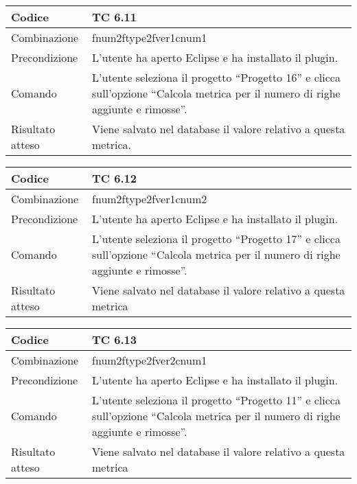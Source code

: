\begin{table}[ht]
\begin{tabular}{|p{3cm}|p{9cm}|}
\hline
\cellcolor{lightgray}Codice				& TC 6.11								\\
\hline
\cellcolor{lightgray}Combinazione		& fnum2ftype2fver1cnum1									\\
\hline
\cellcolor{lightgray}Precondizione		& L'utente ha aperto Eclipse e ha installato il plugin.		\\
\hline
\cellcolor{lightgray}Comando			& L'utente seleziona il progetto ``Progetto 16''  e clicca sull'opzione ``Calcola metrica per il numero di righe aggiunte e rimosse''.	\\
\hline
\cellcolor{lightgray}Risultato atteso	& Viene salvato nel database il valore relativo a questa metrica.\\
\hline
\end{tabular}
\end{table}

\begin{table}[ht]
\begin{tabular}{|p{3cm}|p{9cm}|}
\hline
\cellcolor{lightgray}Codice				& TC 6.12								\\
\hline
\cellcolor{lightgray}Combinazione		& fnum2ftype2fver1cnum2 									\\
\hline
\cellcolor{lightgray}Precondizione		& L'utente ha aperto Eclipse e ha installato il plugin.				\\
\hline
\cellcolor{lightgray}Comando			& L'utente seleziona il progetto ``Progetto 17''  e clicca sull'opzione ``Calcola metrica per il numero di righe aggiunte e rimosse''.	\\
\hline
\cellcolor{lightgray}Risultato atteso	& Viene salvato nel database il valore relativo a questa metrica	\\
\hline
\end{tabular}
\end{table}

\begin{table}[ht]
\begin{tabular}{|p{3cm}|p{9cm}|}
\hline
\cellcolor{lightgray}Codice				& TC 6.13								\\
\hline
\cellcolor{lightgray}Combinazione		& fnum2ftype2fver2cnum1									\\
\hline
\cellcolor{lightgray}Precondizione		& L'utente ha aperto Eclipse e ha installato il plugin.					\\
\hline
\cellcolor{lightgray}Comando			& L'utente seleziona il progetto ``Progetto 11''  e clicca sull'opzione ``Calcola metrica per il numero di righe aggiunte e rimosse''.	\\
\hline
\cellcolor{lightgray}Risultato atteso	& Viene salvato nel database il valore relativo a questa metrica	\\
\hline
\end{tabular}
\end{table}

